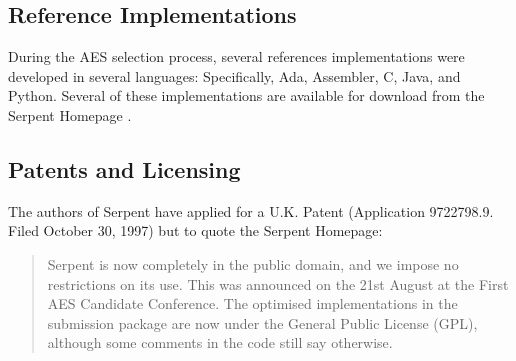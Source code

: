 \subsection{Reference Implementations}

During the AES selection process, several references implementations were developed in several languages: Specifically, Ada, Assembler, C, Java, and Python.\cite[16]{submission} Several of these implementations are available for download from the Serpent Homepage \cite{homepage}.

\subsection{Patents and Licensing}

The authors of Serpent have applied for a U.K. Patent (Application 9722798.9. Filed October 30, 1997) \cite{scan} but to quote the Serpent Homepage:
\blockquote{Serpent is now completely in the public domain, and we impose no restrictions on its use. This was announced on the 21st August at the First AES Candidate Conference. The optimised implementations in the submission package are now under the General Public License (GPL), although some comments in the code still say otherwise.}\cite{homepage}
